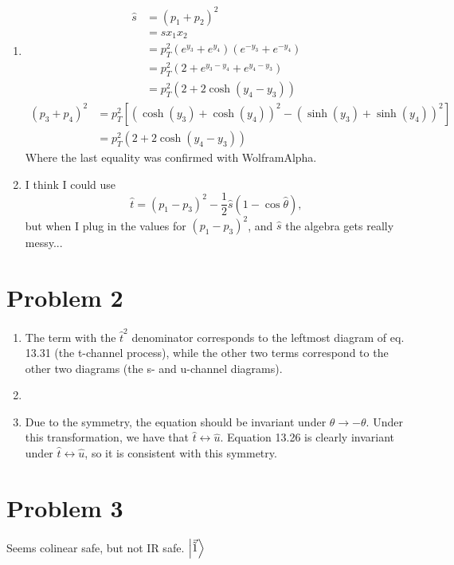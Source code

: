 \documentclass[12pt]{article}
\begin{document}
\begin{enumerate}[label=(\alph*)]
    \item
    \begin{align*}
        \hat{s} &= (p_1 + p_2)^2 \\
        &= s x_1 x_2 \\
        &= p_T^2\left(e^{y_3} + e^{y_4}\right)\left(e^{-y_3} + e^{-y_4}\right) \\
        &= p_T^2\left(2 + e^{y_3-y_4} + e^{y_4-y_3}\right) \\
        &= p_T^2\left(2 + 2\cosh(y_4 - y_3)\right)
    \end{align*}
    \begin{align*}
        (p_3 + p_4)^2 &= p_T^2\left[\left(\cosh(y_3) + \cosh(y_4)\right)^2 - \left(\sinh(y_3) + \sinh(y_4)\right)^2\right] \\
        &= p_T^2\left(2 + 2\cosh(y_4 - y_3)\right)
    \end{align*}
    Where the last equality was confirmed with WolframAlpha.

    \item I think I could use
    \[ \hat{t} = (p_1 - p_3)^2 -\frac{1}{2}\hat{s}(1 - \cos\hat{\theta}), \]
    but when I plug in the values for $(p_1 - p_3)^2$, and $\hat{s}$ the algebra gets really messy...
\end{enumerate}

\section*{Problem 2}
\begin{enumerate}[label=(\alph*)]
    \item The term with the $\hat{t}^2$ denominator corresponds to the leftmost diagram of eq. 13.31 (the t-channel process), while the other two terms correspond to the other two diagrams (the s- and u-channel diagrams).
    \item
    \item Due to the symmetry, the equation should be invariant under $\theta \to -\theta$. Under this transformation, we have that $\hat{t} \leftrightarrow \hat{u}$. Equation 13.26 is clearly invariant under $\hat{t} \leftrightarrow \hat{u}$, so it is consistent with this symmetry.
\end{enumerate}


\section*{Problem 3}
Seems colinear safe, but not IR safe. $\ket{\vec{\tilde{1}}}$
\end{document}

